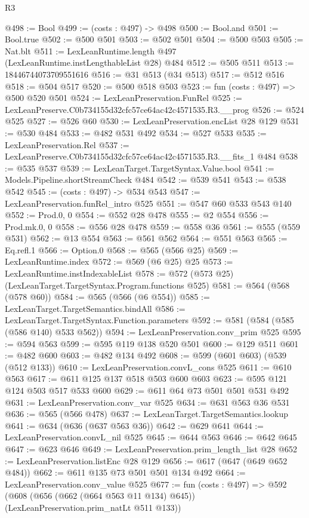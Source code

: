 \begin{lexlean}{R3}
\begin{coremodule}
@498 := Bool
@499 := (costs : @497) -> @498
@500 := Bool.and
@501 := Bool.true
@502 := @500 @501
@503 := @502 @501
@504 := @500 @503
@505 := Nat.blt
@511 := LexLeanRuntime.length @497 (LexLeanRuntime.instLengthableList @28) @484
@512 := @505 @511
@513 := 18446744073709551616
@516 := @31 @513 (@34 @513)
@517 := @512 @516
@518 := @504 @517
@520 := @500 @518 @503
@523 := fun (costs : @497) => @500 @520 @501
@524 := LexLeanPreservation.FunRel
@525 := LexLeanPreserve.C0b734155d32cfc57ce64ac42c4571535.R3.__prog
@526 := @524 @525
@527 := @526 @60
@530 := LexLeanPreservation.encList @28 @129
@531 := @530 @484
@533 := @482 @531 @492
@534 := @527 @533
@535 := LexLeanPreservation.Rel
@537 := LexLeanPreserve.C0b734155d32cfc57ce64ac42c4571535.R3.__fits_1 @484
@538 := @535 @537
@539 := LexLeanTarget.TargetSyntax.Value.bool
@541 := Models.Pipeline.shortStreamCheck @484
@542 := @539 @541
@543 := @538 @542
@545 := (costs : @497) -> @534 @543
@547 := LexLeanPreservation.funRel_intro @525
@551 := @547 @60 @533 @543 @140
@552 := Prod.{0, 0}
@554 := @552 @28 @478
@555 := @2 @554
@556 := Prod.mk.{0, 0}
@558 := @556 @28 @478
@559 := @558 @36
@561 := @555 (@559 @531)
@562 := @13 @554
@563 := @561 @562
@564 := @551 @563
@565 := Eq.refl.{1}
@566 := Option.{0}
@568 := @565 (@566 @25)
@569 := LexLeanRuntime.index
@572 := @569 (@6 @25) @25
@573 := LexLeanRuntime.instIndexableList
@578 := @572 (@573 @25) (LexLeanTarget.TargetSyntax.Program.functions @525)
@581 := @564 (@568 (@578 @60))
@584 := @565 (@566 (@6 @554))
@585 := LexLeanTarget.TargetSemantics.bindAll
@586 := LexLeanTarget.TargetSyntax.Function.parameters
@592 := @581 (@584 (@585 (@586 @140) @533 @562))
@594 := LexLeanPreservation.conv_prim @525
@595 := @594 @563
@599 := @595 @119 @138 @520 @501
@600 := @129 @511
@601 := @482 @600
@603 := @482 @134 @492
@608 := @599 (@601 @603) (@539 (@512 @133))
@610 := LexLeanPreservation.convL_cons @525
@611 := @610 @563
@617 := @611 @125 @137 @518 @503 @600 @603
@623 := @595 @121 @124 @503 @517 @533 @600
@629 := @611 @64 @73 @501 @501 @531 @492
@631 := LexLeanPreservation.conv_var @525
@634 := @631 @563 @36 @531
@636 := @565 (@566 @478)
@637 := LexLeanTarget.TargetSemantics.lookup
@641 := @634 (@636 (@637 @563 @36))
@642 := @629 @641
@644 := LexLeanPreservation.convL_nil @525
@645 := @644 @563
@646 := @642 @645
@647 := @623 @646
@649 := LexLeanPreservation.prim_length_list @28
@652 := LexLeanPreservation.listEnc @28 @129
@656 := @617 (@647 (@649 @652 @484))
@662 := @611 @135 @73 @501 @501 @134 @492
@664 := LexLeanPreservation.conv_value @525
@677 := fun (costs : @497) =>
  @592 (@608 (@656 (@662 (@664 @563 @11 @134) @645)) (LexLeanPreservation.prim_natLt @511 @133))

\end{coremodule}
\end{lexlean}
